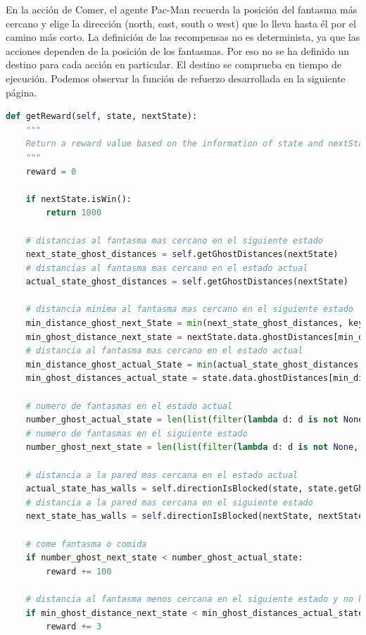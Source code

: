 \documentclass[11pt]{exam}
\begin{document}
En la acción de Comer, el agente Pac-Man recuerda la posición del fantasma más cercano y elige la dirección (north, east, south o west) que lo lleva hasta él por el camino más corto. La definición de las recompensas no es determinista, ya que las acciones dependen de la posición de los fantasmas. Por eso no se ha definido un destino para cada acción en particular. El destino se comprueba en tiempo de ejecución. Podemos observar la función de refuerzo desarrollada en la siguiente página.

\begin{lstlisting}[language=python, basicstyle=\tiny]
def getReward(self, state, nextState):
	"""
	Return a reward value based on the information of state and nextState
	"""
	reward = 0
	
	if nextState.isWin():
		return 1000
	
	# distancias al fantasma mas cercano en el siguiente estado
	next_state_ghost_distances = self.getGhostDistances(nextState)
	# distancias al fantasma mas cercano en el estado actual
	actual_state_ghost_distances = self.getGhostDistances(nextState)
	
	# distancia minima al fantasma mas cercano en el siguiente estado
	min_distance_ghost_next_State = min(next_state_ghost_distances, key=lambda t: t[1])[0]
	min_ghost_distance_next_state = nextState.data.ghostDistances[min_distance_ghost_next_State]
	# distancia al fantasma mas cercano en el estado actual
	min_distance_ghost_actual_State = min(actual_state_ghost_distances, key=lambda t: t[1])[0]
	min_ghost_distances_actual_state = state.data.ghostDistances[min_distance_ghost_actual_State]
	
	# numero de fantasmas en el estado actual
	number_ghost_actual_state = len(list(filter(lambda d: d is not None, state.data.ghostDistances)))
	# numero de fantasmas en el siguiente estado
	number_ghost_next_state = len(list(filter(lambda d: d is not None, nextState.data.ghostDistances)))
	
	# distancia a la pared mas cercana en el estado actual
	actual_state_has_walls = self.directionIsBlocked(state, state.getGhostPositions()[min_distance_ghost_next_State])
	# distancia a la pared mas cercana en el siguiente estado
	next_state_has_walls = self.directionIsBlocked(nextState, nextState.getGhostPositions()[min_distance_ghost_next_State])
	
	# come fantasma o comida
	if number_ghost_next_state < number_ghost_actual_state:
		reward += 100
	
	# distancia al fantasma menos cercana en el siguiente estado y no hay paredes y no come
	if min_ghost_distance_next_state < min_ghost_distances_actual_state and not actual_state_has_walls and number_ghost_next_state == number_ghost_actual_state:
		reward += 3
	

\end{lstlisting}
\end{document}
